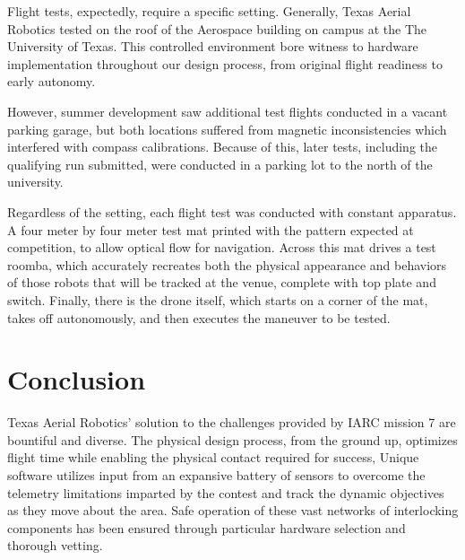 \documentclass[12pt,letterpaper]{article}
\begin{document}
    	Flight tests, expectedly, require a specific setting. Generally, Texas Aerial Robotics tested on the roof of the Aerospace building on campus at the The University of Texas. This controlled environment bore witness to hardware implementation throughout our design process, from original flight readiness to early autonomy.

		However, summer development saw additional test flights conducted in a vacant parking garage, but both locations suffered from magnetic inconsistencies which interfered with compass calibrations. Because of this, later tests, including the qualifying run submitted, were conducted in a parking lot to the north of the university. 

		Regardless of the setting, each flight test was conducted with constant apparatus. A four meter by four meter test mat printed with the pattern expected at competition, to allow optical flow for navigation. Across this mat drives a test roomba, which accurately recreates both the physical appearance and behaviors of those robots that will be tracked at the venue, complete with top plate and switch. Finally, there is the drone itself, which starts on a corner of the mat, takes off autonomously, and then executes the maneuver to be tested.


\section*{Conclusion}
		Texas Aerial Robotics’ solution to the challenges provided by IARC mission 7 are bountiful and diverse. The physical design process, from the ground up, optimizes flight time while enabling the physical contact required for success, Unique software utilizes input from an expansive battery of sensors to overcome the telemetry limitations imparted by the contest and track the dynamic objectives as they move about the area. Safe operation of these vast networks of interlocking components has been ensured through particular hardware selection and thorough vetting.
	\nocite{redmon2016yolo9000}
	
	
\end{document}
